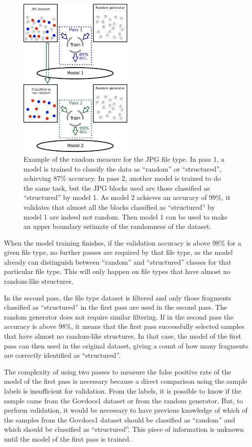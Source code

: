 \noindent
\begin{figure}[htb!]
\centering\includegraphics[width=0.5\textwidth]{content/random_measure.png}
\caption{\label{fig:randommeasure}Example of the random measure for the JPG file type. In pass 1, a model is trained to classify the data as ``random'' or ``structured'', achieving 87\% accuracy. In pass 2, another model is trained to do the same task, but the JPG blocks used are those classified as ``structured'' by model 1. As model 2 achieves an accuracy of 99\%, it validates that almost all the blocks classified as ``structured'' by model 1 are indeed not random. Then model 1 can be used to make an upper boundary estimate of the randomness of the dataset.}%
\end{figure}

When the model training finishes, if the validation accuracy is above 98\% for a given file type, no further passes are required by that file type, as the model already can distinguish between ``random'' and ``structured'' classes for that particular file type. This will only happen on file types that have almost no random-like structures.

In the second pass, the file type dataset is filtered and only those fragments classified as ``structured'' in the first pass are used in the second pass. The random generator does not require similar filtering. If in the second pass the accuracy is above 98\%, it means that the first pass successfully selected samples that have almost no random-like structures. In that case, the model of the first pass can then used in the original dataset, giving a count of how many fragments are correctly identified as ``structured''.

The complexity of using two passes to measure the false positive rate of the model of the first pass is necessary because a direct comparison using the sample labels is insufficient for validation. From the labels, it is possible to know if the sample came from the Govdocs1 dataset or from the random generator. But, to perform validation, it would be necessary to have previous knowledge of which of the samples from the Govdocs1 dataset should be classified as ``random'' and which should be classified as ``structured''. This piece of information is unknown until the model of the first pass is trained.
